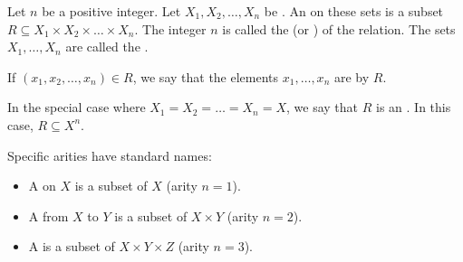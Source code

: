 \begin{definition} \label{definition:n_ary_relation_on_sets}
    Let $n$ be a positive integer. Let $X_1, X_2, \dots, X_n$ be . An  on these sets is a subset $R \subseteq X_1 \times X_2 \times \dots \times X_n$. The integer $n$ is called the  (or ) of the relation. The sets $X_1, \dots, X_n$ are called the .

    If $(x_1, x_2, \dots, x_n) \in R$, we say that the elements $x_1, \dots, x_n$ are  by $R$.

    In the special case where $X_1 = X_2 = \dots = X_n = X$, we say that $R$ is an . In this case, $R \subseteq X^n$.

    Specific arities have standard names:
    \begin{itemize}
        \item A  on $X$ is a subset of $X$ (arity $n=1$).
        \item A  from $X$ to $Y$ is a subset of $X \times Y$ (arity $n=2$).
        \item A  is a subset of $X \times Y \times Z$ (arity $n=3$).
    \end{itemize}
\end{definition}